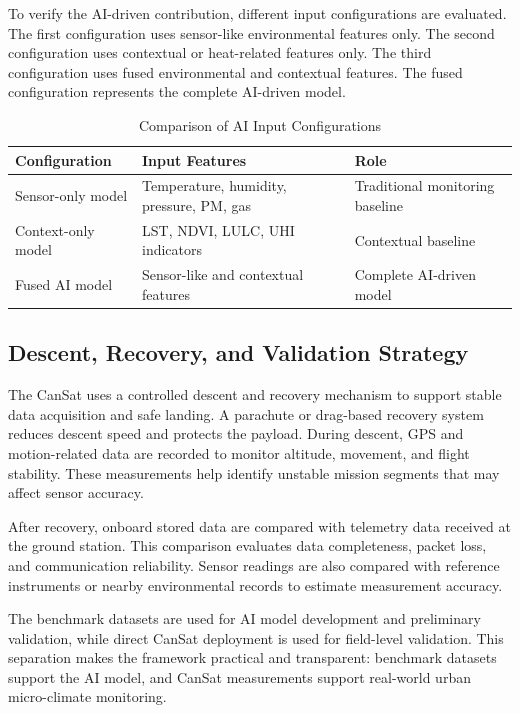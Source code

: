 \documentclass[conference]{IEEEtran}
\begin{document}
To verify the AI-driven contribution, different input configurations are evaluated. The first configuration uses sensor-like environmental features only. The second configuration uses contextual or heat-related features only. The third configuration uses fused environmental and contextual features. The fused configuration represents the complete AI-driven model.

\begin{table}[!t]
\caption{Comparison of AI Input Configurations}
\centering
\footnotesize
\begin{tabular}{p{2.3cm} p{2.6cm} p{2.1cm}}
\hline
\textbf{Configuration} & \textbf{Input Features} & \textbf{Role} \\
\hline
Sensor-only model & Temperature, humidity, pressure, PM, gas & Traditional monitoring baseline \\
Context-only model & LST, NDVI, LULC, UHI indicators & Contextual baseline \\
Fused AI model & Sensor-like and contextual features & Complete AI-driven model \\
\hline
\end{tabular}
\label{tab:fusion_config}
\end{table}

\subsection{Descent, Recovery, and Validation Strategy}

The CanSat uses a controlled descent and recovery mechanism to support stable data acquisition and safe landing. A parachute or drag-based recovery system reduces descent speed and protects the payload. During descent, GPS and motion-related data are recorded to monitor altitude, movement, and flight stability. These measurements help identify unstable mission segments that may affect sensor accuracy.

After recovery, onboard stored data are compared with telemetry data received at the ground station. This comparison evaluates data completeness, packet loss, and communication reliability. Sensor readings are also compared with reference instruments or nearby environmental records to estimate measurement accuracy.

The benchmark datasets are used for AI model development and preliminary validation, while direct CanSat deployment is used for field-level validation. This separation makes the framework practical and transparent: benchmark datasets support the AI model, and CanSat measurements support real-world urban micro-climate monitoring.
\end{document}
